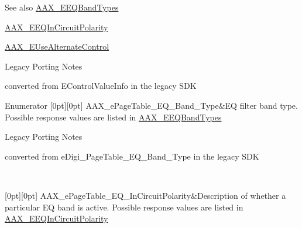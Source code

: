 \begin{DoxySeeAlso}{See also}
\mbox{\hyperlink{a00491_a9ec6da28e827496514bd15d6f2b26d95}{A\+A\+X\+\_\+\+E\+E\+Q\+Band\+Types}} 

\mbox{\hyperlink{a00491_ab5bda96f09874705e9b800d1b1495b48}{A\+A\+X\+\_\+\+E\+E\+Q\+In\+Circuit\+Polarity}} 

\mbox{\hyperlink{a00491_abbcc8b4e8207262a5dd9e32047a51a29}{A\+A\+X\+\_\+\+E\+Use\+Alternate\+Control}}
\end{DoxySeeAlso}
\begin{DoxyRefDesc}{Legacy Porting Notes}
\item[\mbox{\hyperlink{a00787__porting_notes000011}{Legacy Porting Notes}}]converted from {\ttfamily E\+Control\+Value\+Info} in the legacy S\+DK \end{DoxyRefDesc}
\begin{DoxyEnumFields}{Enumerator}
[0pt][0pt]{}\mbox{\label{a00491_aa169208a2ce713fa021e20deb2eaf608a99ca84cc3dae0f125082d36893a12bcd}} 
A\+A\+X\+\_\+e\+Page\+Table\+\_\+\+E\+Q\+\_\+\+Band\+\_\+\+Type&EQ filter band type. Possible response values are listed in \mbox{\hyperlink{a00491_a9ec6da28e827496514bd15d6f2b26d95}{A\+A\+X\+\_\+\+E\+E\+Q\+Band\+Types}}

\begin{DoxyRefDesc}{Legacy Porting Notes}
\item[\mbox{\hyperlink{a00787__porting_notes000024}{Legacy Porting Notes}}]converted from {\ttfamily e\+Digi\+\_\+\+Page\+Table\+\_\+\+E\+Q\+\_\+\+Band\+\_\+\+Type} in the legacy S\+DK\end{DoxyRefDesc}
\\
\hline

[0pt][0pt]{}\mbox{\label{a00491_aa169208a2ce713fa021e20deb2eaf608ac5a06a293b7706191d3371813c47e999}} 
A\+A\+X\+\_\+e\+Page\+Table\+\_\+\+E\+Q\+\_\+\+In\+Circuit\+Polarity&Description of whether a particular EQ band is active. Possible response values are listed in \mbox{\hyperlink{a00491_ab5bda96f09874705e9b800d1b1495b48}{A\+A\+X\+\_\+\+E\+E\+Q\+In\+Circuit\+Polarity}}


\end{DoxyEnumFields}
